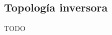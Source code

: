 \documentclass[letterpaper, 10 pt, conference]{ieeeconf}  %
\begin{document}
\subsection{Topología inversora}

\begin{thebibliography}{99}

TODO
%
\end{thebibliography}
\end{document}
